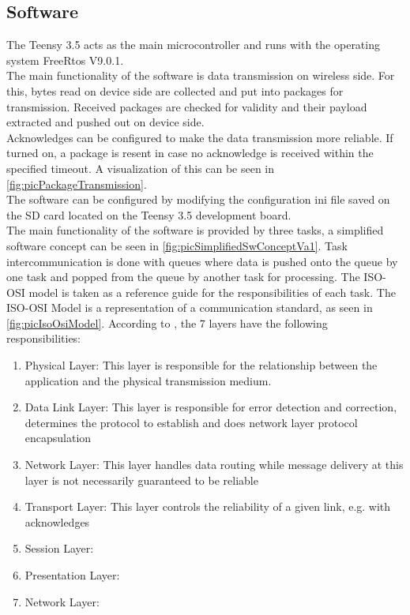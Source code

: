\subsection{Software} \label{sec:txtSwOutcomeVa1}
The Teensy 3.5 acts as the main microcontroller and runs with the operating system FreeRtos V9.0.1.\\
The main functionality of the software is data transmission on wireless side. For this, bytes read on device side are collected and put into packages for transmission. Received packages are checked for validity and their payload extracted and pushed out on device side.\\
Acknowledges can be configured to make the data transmission more reliable. If turned on, a package is resent in case no acknowledge is received within the specified timeout. A visualization of this can be seen in \autoref{fig:picPackageTransmission}.\\
%
%
%
The software can be configured by modifying the configuration ini file saved on the SD card located on the Teensy 3.5 development board.\\
The main functionality of the software is provided by three tasks, a simplified software concept can be seen in \autoref{fig:picSimplifiedSwConceptVa1}. Task intercommunication is done with queues where data is pushed onto the queue by one task and popped from the queue by another task for processing. The ISO-OSI model is taken as a reference guide for the responsibilities of each task. The ISO-OSI Model is a representation of a communication standard, as seen in \autoref{fig:picIsoOsiModel}. According to \cite{IsoOsiModel_Wikipedia}, the 7 layers have the following responsibilities:\begin{enumerate}
    \item Physical Layer: This layer is responsible for the relationship between the application and the physical transmission medium.
    \item Data Link Layer: This layer is responsible for error detection and correction, determines the protocol to establish and does network layer protocol encapsulation
    \item Network Layer: This layer handles data routing while message delivery at this layer is not necessarily guaranteed to be reliable
    \item Transport Layer: This layer controls the reliability of a given link, e.g. with acknowledges
    \item Session Layer:
    \item Presentation Layer:
    \item Network Layer:
\end{enumerate}
